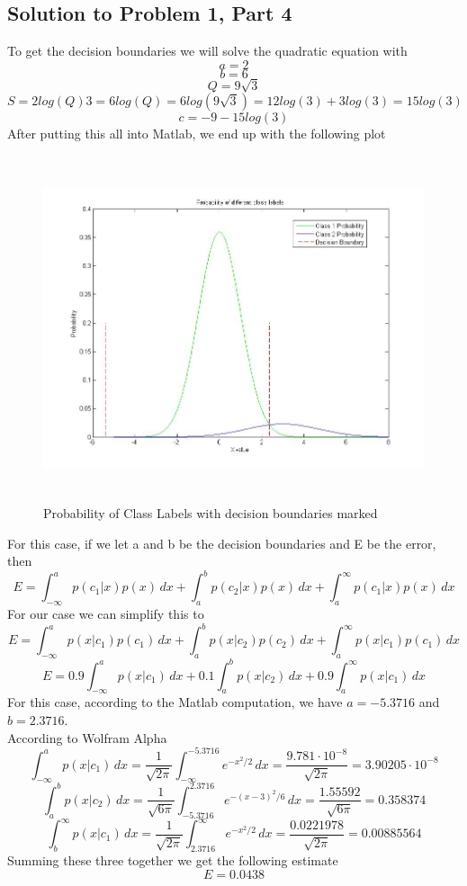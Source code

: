 \documentclass[11pt,psfig]{article}
\begin{document}
\subsection*{Solution to Problem 1, Part 4}

To get the decision boundaries we will solve the quadratic equation with
\[
a = 2
\]
\[
b = 6
\]
\[
Q = 9 \sqrt{3}
\]
\[
S = 2 log(Q) 3 = 6 log(Q) = 6log( 9 \sqrt{3}) = 12 log(3) + 3 log(3) = 15 log(3)
\]
\[
c = -9 - 15 log(3)
\]
After putting this all into Matlab, we end up with the following plot
\begin{figure}[H]
\centering
\includegraphics[height=4in]{prob1part2plot.jpg}
\caption{Probability of Class Labels with decision boundaries marked}
\end{figure}

For this case, if we let a and b be the decision boundaries and E be the error, then
\[
E = \int_{-\infty}^{a}{p(c_1|x)p(x) \, dx} + \int_{a}^{b}{p(c_2|x)p(x) \, dx} + \int_{a}^{\infty}{p(c_1|x)p(x) \, dx}
\]
For our case we can simplify this to
\[
E = \int_{-\infty}^{a}{p(x|c_1)p(c_1) \, dx} + \int_{a}^{b}{p(x|c_2)p(c_2) \, dx} + \int_{a}^{\infty}{p(x|c_1)p(c_1) \, dx}
\]
\[
E = 0.9\int_{-\infty}^{a}{p(x|c_1) \, dx} + 0.1\int_{a}^{b}{p(x|c_2) \, dx} + 0.9\int_{a}^{\infty}{p(x|c_1) \, dx}
\]
For this case, according to the Matlab computation, we have $a=-5.3716$ and $b=2.3716$. \\
According to Wolfram Alpha
\[
\int_{-\infty}^{a}{p(x|c_1) \, dx} = \frac{1}{\sqrt{2\pi}} \int_{-\infty}^{-5.3716}{e^{-x^2/2} \, dx} = \frac{9.781 \cdot 10^{-8}}{\sqrt{2\pi}} = 3.90205 \cdot 10^{-8}
\]
\[
\int_{a}^{b}{p(x|c_2) \, dx} = \frac{1}{\sqrt{6\pi}} \int_{-5.3716}^{2.3716}{e^{-(x-3)^2/6} \, dx} = \frac{1.55592}{\sqrt{6\pi}} = 0.358374
\]
\[
\int_{b}^{\infty}{p(x|c_1) \, dx} = \frac{1}{\sqrt{2\pi}} \int_{2.3716}^{\infty}{e^{-x^2/2} \, dx} = \frac{0.0221978}{\sqrt{2\pi}} = 0.00885564
\]
Summing these three together we get the following estimate
\[
E = 0.0438
\]
\end{document}
